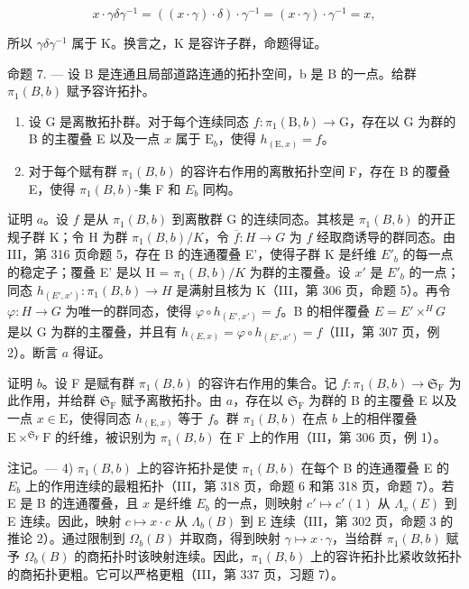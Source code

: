 \[
x \cdot \gamma \delta \gamma^ {- 1} = ((x \cdot \gamma) \cdot \delta) \cdot \gamma^ {- 1} = (x \cdot \gamma) \cdot \gamma^ {- 1} = x,
\]

所以 \(\gamma\delta\gamma^{-1}\) 属于 K。换言之，K 是容许子群，命题得证。

命题 7. --- 设 B 是连通且局部道路连通的拓扑空间，b 是 B 的一点。给群 \(\pi_1(B, b)\) 赋予容许拓扑。

\begin{enumerate}
\def\labelenumi{\alph{enumi})}
\item
  设 G 是离散拓扑群。对于每个连续同态 \(f\colon \pi_{1}(\mathrm{B},b)\to \mathrm{G}\)，存在以 G 为群的 B 的主覆叠 E 以及一点 \(x\) 属于 \(\mathrm{E}_{b}\)，使得 \(h_{(\mathrm{E},x)} = f\)。
\item
  对于每个赋有群 \(\pi_{1}(B,b)\) 的容许右作用的离散拓扑空间 F，存在 B 的覆叠 E，使得 \(\pi_{1}(B,b)\)-集 F 和 \(E_{b}\) 同构。
\end{enumerate}

证明 \(a\)。设 \(f\) 是从 \(\pi_1(B, b)\) 到离散群 G 的连续同态。其核是 \(\pi_1(B, b)\) 的开正规子群 K；令 H 为群 \(\pi_1(B, b)/K\)，令 \(\overline{f} \colon H \to G\) 为 \(f\) 经取商诱导的群同态。由 III，第 316 页命题 5，存在 B 的连通覆叠 E'，使得子群 K 是纤维 \(E'_{b}\) 的每一点的稳定子；覆叠 E' 是以 H = \(\pi_1(B, b)/K\) 为群的主覆叠。设 \(x'\) 是 \(E'_{b}\) 的一点；同态 \(h_{(E', x')} \colon \pi_1(B, b) \to H\) 是满射且核为 K（III，第 306 页，命题 5）。再令 \(\varphi \colon H \to G\) 为唯一的群同态，使得 \(\varphi \circ h_{(E', x')} = f\)。B 的相伴覆叠 \(E = E' \times^{H} G\) 是以 G 为群的主覆叠，并且有 \(h_{(E, x)} = \varphi \circ h_{(E', x')} = f\)（III，第 307 页，例 2）。断言 \(a\) 得证。

证明 \(b\)。设 F 是赋有群 \(\pi_1(B,b)\) 的容许右作用的集合。记 \(f: \pi_1(B,b) \to \mathfrak{S}_{\mathrm{F}}\) 为此作用，并给群 \(\mathfrak{S}_{\mathrm{F}}\) 赋予离散拓扑。由 \(a\)，存在以 \(\mathfrak{S}_{\mathrm{F}}\) 为群的 B 的主覆叠 E 以及一点 \(x \in \mathrm{E}\)，使得同态 \(h_{(\mathrm{E},x)}\) 等于 \(f\)。群 \(\pi_1(B,b)\) 在点 \(b\) 上的相伴覆叠 \(\mathrm{E} \times^{\mathfrak{S}_{\mathrm{F}}} \mathrm{F}\) 的纤维，被识别为 \(\pi_1(B,b)\) 在 F 上的作用（III，第 306 页，例 1）。

注记。--- 4) \(\pi_1(B, b)\) 上的容许拓扑是使 \(\pi_1(B, b)\) 在每个 B 的连通覆叠 E 的 \(E_b\) 上的作用连续的最粗拓扑（III，第 318 页，命题 6 和第 318 页，命题 7）。若 E 是 B 的连通覆叠，且 \(x\) 是纤维 \(E_b\) 的一点，则映射 \(c' \mapsto c'(1)\) 从 \(\Lambda_x(E)\) 到 E 连续。因此，映射 \(c \mapsto x \cdot c\) 从 \(\Lambda_b(B)\) 到 E 连续（III，第 302 页，命题 3 的推论 2）。通过限制到 \(\Omega_b(B)\) 并取商，得到映射 \(\gamma \mapsto x \cdot \gamma\)，当给群 \(\pi_1(B, b)\) 赋予 \(\Omega_b(B)\) 的商拓扑时该映射连续。因此，\(\pi_{1}(B,b)\) 上的容许拓扑比紧收敛拓扑的商拓扑更粗。它可以严格更粗（III，第 337 页，习题 7）。

